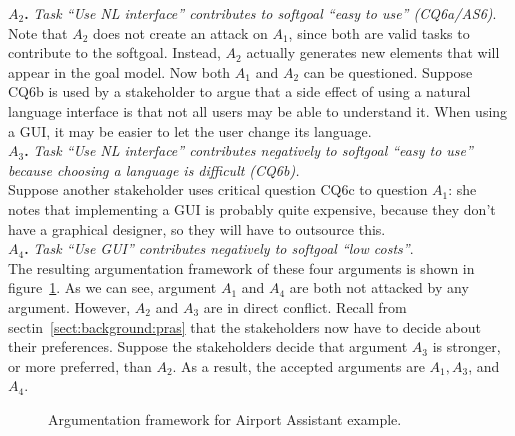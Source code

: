 \documentclass[11.5pt,two column]{llncs}
\begin{document}
\noindent
\textbf{$A_2$.} \emph{Task ``Use NL interface'' contributes to softgoal ``easy to use'' (CQ6a/AS6)}.\\

\noindent
Note that $A_2$ does not create an attack on $A_1$, since both are valid tasks to contribute to the softgoal. Instead, $A_2$ actually generates new elements that will appear in the goal model.  Now both $A_1$ and $A_2$ can be questioned. Suppose CQ6b is used by a stakeholder to argue that a side effect of using a natural language interface is that not all users may be able to understand it. When using a GUI, it may be easier to let the user change its language.\\

\noindent
\textbf{$A_3$.} \emph{Task ``Use NL interface'' contributes negatively to softgoal ``easy to use'' because choosing a language is difficult (CQ6b).}\\

Suppose another stakeholder uses critical question CQ6c to question $A_1$: she notes that implementing a GUI is probably quite expensive, because they don't have a graphical designer, so they will have to outsource this.\\

\noindent
\textbf{$A_4$.} \emph{Task ``Use GUI'' contributes negatively to softgoal ``low costs''}.\\

\noindent
The resulting argumentation framework of these four arguments is shown in figure~\ref{fig:example:airport:arguments}. As we can see, argument $A_1$ and $A_4$ are both not attacked by any argument. However, $A_2$ and $A_3$ are in direct conflict. Recall from sectin~\ref{sect:background:pras} that the stakeholders now have to decide about their preferences. Suppose the stakeholders decide that argument $A_3$ is stronger, or more preferred, than $A_2$. As a result, the accepted arguments are $A_1, A_3$, and $A_4$. 

\begin{figure}
\centering
{}
\caption{Argumentation framework for Airport Assistant example.}
\label{fig:example:airport:arguments}
\end{figure}
\end{document}
